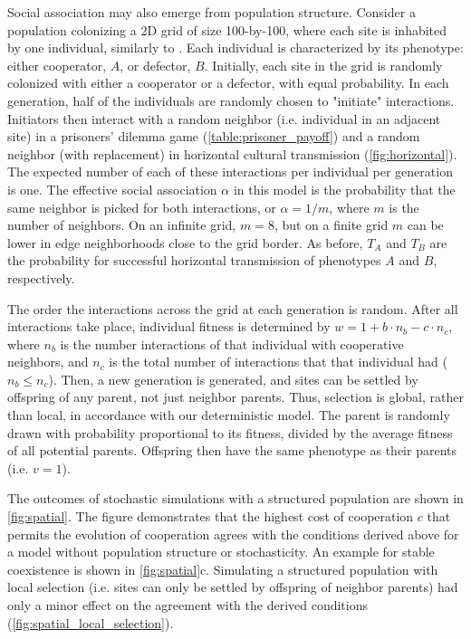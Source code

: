 \documentclass[12pt]{extarticle}
\begin{document}
Social association may also emerge from population structure.
Consider a  population colonizing a 2D grid of size 100-by-100, where each site is inhabited by one individual, similarly to \citet{lewin2020rockpaperscissors}.
Each individual is characterized by its phenotype: either cooperator, $A$, or defector, $B$.
Initially, each site in the grid is randomly colonized with either a cooperator or a defector, with equal probability.
In each generation, half of the individuals are randomly chosen to "initiate" interactions.
Initiators then interact with a random neighbor (i.e. individual in an adjacent site) in a prisoners' dilemma game (\autoref{table:prisoner_payoff}) and a random neighbor (with replacement) in horizontal cultural transmission (\autoref{fig:horizontal}).
The expected number of each of these interactions per individual per generation is one.
The effective social association $\alpha$ in this model is the probability that the same neighbor is picked for both interactions, or $\alpha=1/m$, where $m$ is the number of neighbors.
On an infinite grid, $m=8$, but on a finite grid $m$ can be lower in edge neighborhoods close to the grid border.
As before, $T_A$ and $T_B$ are the probability for successful horizontal transmission of phenotypes $A$ and $B$, respectively.

The order the interactions across the grid at each generation is random.
After all interactions take place, individual fitness is determined by
$w = 1 + b \cdot n_b - c \cdot n_c$,
where $n_b$ is the number interactions of that individual with cooperative neighbors, and $n_c$ is the total number of interactions that that individual  had ($n_b \le n_c$).
Then, a new generation is generated, and sites can be settled by offspring of any parent, not just neighbor parents. Thus, selection is global, rather than local, in accordance with our deterministic model.
The parent is randomly drawn with probability proportional to its fitness, divided by the average fitness of all potential parents.
Offspring then have the same phenotype as their parents (i.e. $v=1$).

The outcomes of stochastic simulations with a structured population are shown in \autoref{fig:spatial}. The figure demonstrates that the highest cost of cooperation $c$ that permits the evolution of cooperation agrees with the conditions derived above for a model without population structure or stochasticity.
An example for stable coexistence is shown in \autoref{fig:spatial}c.
Simulating a structured population with local selection (i.e. sites can only be settled by offspring of neighbor parents) had only a minor effect on the agreement with the derived conditions (\autoref{fig:spatial_local_selection}).
\end{document}
